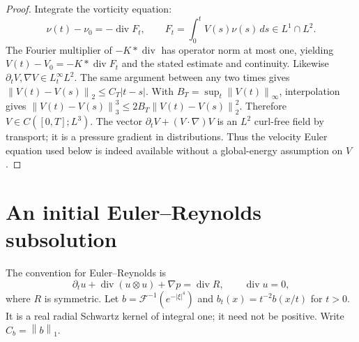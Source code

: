 \documentclass[11pt]{article}
\theoremstyle{remark}\newtheorem{remark}[theorem]{Remark}
\newcommand{\Div}{\operatorname{div}}
\newcommand{\norm}[2]{\left\|#1\right\|_{#2}}
\begin{document}
\begin{proof}
Integrate the vorticity equation:
\[
 \nu(t)-\nu_0=-\Div F_t,\qquad F_t=\int_0^t V(s)\nu(s)\,ds\in L^1\cap L^2.
\]
The Fourier multiplier of $-K*\Div$ has operator norm at most one, yielding
$V(t)-V_0=-K*\Div F_t$ and the stated estimate and continuity. Likewise
$\partial_tV,\nabla V\in L^\infty_tL^2$. The same argument between
any two times gives $\norm{V(t)-V(s)}2\leq C_T|t-s|$. With
$B_T=\sup_t\norm{V(t)}\infty$, interpolation gives
$\norm{V(t)-V(s)}3^3\leq2B_T\norm{V(t)-V(s)}2^2$.
Therefore $V\in C([0,T];L^3)$. The vector
$\partial_tV+(V\cdot\nabla)V$ is an $L^2$ curl-free field by transport;
it is a pressure gradient in distributions. Thus the velocity Euler equation
used below is indeed available without a global-energy assumption on $V$.
\end{proof}

\section{An initial Euler--Reynolds subsolution}

The convention for Euler--Reynolds is
\begin{equation}\label{eq:ER}
 \partial_tu+\Div(u\otimes u)+\nabla p=\Div R,
 \qquad \Div u=0,
\end{equation}
where $R$ is symmetric. Let $b=\mathcal F^{-1}(e^{-|\xi|^4})$ and
$b_t(x)=t^{-2}b(x/t)$ for $t>0$. It is a real radial Schwartz kernel of
integral one; it need not be positive. Write $C_b=\norm b1$.
\end{document}
